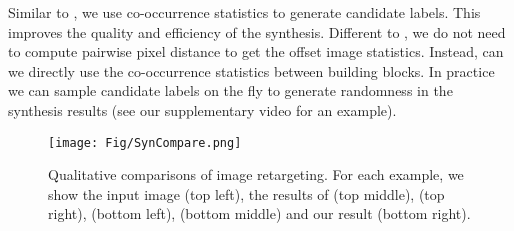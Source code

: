 \documentclass{acmtog}
\begin{document}
Similar to \cite{He2012PO}, we use co-occurrence statistics to generate candidate labels. This improves the quality and efficiency of the synthesis. Different to \cite{He2012PO}, we do not need to compute pairwise pixel distance to get the offset image statistics. Instead, can we directly use the co-occurrence statistics between building blocks. In practice we can sample candidate labels on the fly to generate randomness in the synthesis results (see our supplementary video for an example).

\begin{figure*}
	\centering
		\texttt{[image: Fig/SynCompare.png]}
	\caption{Qualitative comparisons of image retargeting. For each example, we show the input image (top left), the results of \protect\cite{Kwatra2005TO} (top middle), \protect\cite{Simakov2008SV} (top right), \protect\cite{Pritch09ICCV} (bottom left), \protect\cite{He2012PO} (bottom middle) and our result (bottom right).}
	\label{fig:SynCompare} \vspace{-10pt}
\end{figure*}
\end{document}
